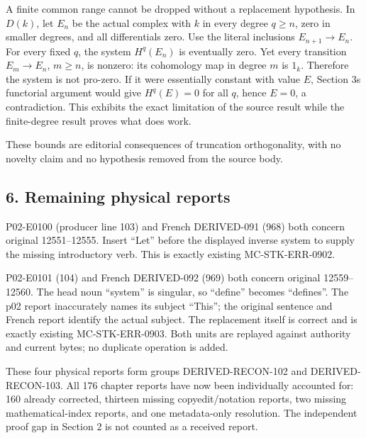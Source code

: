 \documentclass[11pt]{article}
\begin{document}
A finite common range cannot be dropped without a replacement hypothesis. In \(D(k)\),\allowbreak{} let \(E_n\) be the actual complex with \(k\) in every degree \(q\geq n\),\allowbreak{} zero in smaller degrees,\allowbreak{} and all differentials zero. Use the literal inclusions \(E_{n+1}\to E_n\). For every fixed \(q\),\allowbreak{} the system \(H^q(E_n)\) is eventually zero. Yet every transition \(E_m\to E_n\),\allowbreak{} \(m\geq n\),\allowbreak{} is nonzero:\allowbreak{} its cohomology map in degree \(m\) is \(1_k\). Therefore the system is not pro-zero. If it were essentially constant with value \(E\),\allowbreak{} Section 3\textquotesingle s functorial argument would give \(H^q(E)=0\) for all \(q\),\allowbreak{} hence \(E=0\),\allowbreak{} a contradiction. This exhibits the exact limitation of the source result while the finite-degree result proves what does work.

These bounds are editorial consequences of truncation orthogonality,\allowbreak{} with no novelty claim and no hypothesis removed from the source body.

\subsection{6. Remaining physical reports}\label{proofs-12380-12604-remaining-physical-reports}

P02-E0100 (producer line 103)\allowbreak{} and French DERIVED-091 (968)\allowbreak{} both concern original 12551–\allowbreak{}12555. Insert ``Let'' before the displayed inverse system to supply the missing introductory verb. This is exactly existing MC-STK-ERR-0902.

P02-E0101 (104)\allowbreak{} and French DERIVED-092 (969)\allowbreak{} both concern original 12559–\allowbreak{}12560. The head noun ``system'' is singular,\allowbreak{} so ``define'' becomes ``defines''. The p02 report inaccurately names its subject ``This''; the original sentence and French report identify the actual subject. The replacement itself is correct and is exactly existing MC-STK-ERR-0903. Both units are replayed against authority and current bytes; no duplicate operation is added.

These four physical reports form groups DERIVED-RECON-102 and DERIVED-RECON-103. All 176 chapter reports have now been individually accounted for:\allowbreak{} 160 already corrected,\allowbreak{} thirteen missing copyedit/\allowbreak{}notation reports,\allowbreak{} two missing mathematical-index reports,\allowbreak{} and one metadata-only resolution. The independent proof gap in Section 2 is not counted as a received report.
\end{document}

